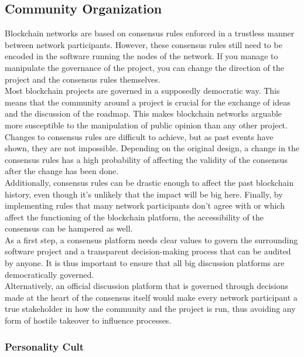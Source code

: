 \documentclass[12pt,a4paper]{article}
\begin{document}
\subsection{Community Organization}

Blockchain networks are based on consensus rules enforced in a trustless manner between network participants. However, these consensus rules still need to be encoded in the software running the nodes of the network. If you manage to manipulate the governance of the project, you can change the direction of the project and the consensus rules themselves.\\

Most blockchain projects are governed in a supposedly democratic way. This means that the community around a project is crucial for the exchange of ideas and the discussion of the roadmap. This makes blockchain networks arguable more susceptible to the manipulation of public opinion than any other project.\\

Changes to consensus rules are difficult to achieve, but as past events have shown, they are not impossible. Depending on the original design, a change in the consensus rules has a high probability of affecting the validity of the consensus after the change has been done.\\

Additionally, consensus rules can be drastic enough to affect the past blockchain history, even though it's unlikely that the impact will be big here. Finally, by implementing rules that many network participants don't agree with or which affect the functioning of the blockchain platform, the accessibility of the consensus can be hampered as well.\\

As a first step, a consensus platform needs clear values to govern the surrounding software project and a transparent decision-making process that can be audited by anyone. It is thus important to ensure that all big discussion platforms are democratically governed.\\

Alternatively, an official discussion platform that is governed through decisions made at the heart of the consensus itself would make every network participant a true stakeholder in how the community and the project is run, thus avoiding any form of hostile takeover to influence processes.\\

\subsubsection{Personality Cult}
\end{document}
